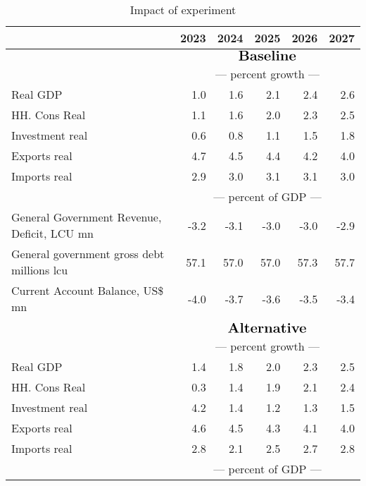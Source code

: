 \documentclass{article}
\begin{document}
\begin{table}[ht]
\caption{Impact of experiment}
\begin{tabular}{lrrrrr}
\toprule
 & 2023 & 2024 & 2025 & 2026 & 2027 \\
\midrule
&\multicolumn{5}{c}{{$\Large \textbf{Baseline}$}}                                                                                                     \\
&\multicolumn{5}{c}{{---  percent growth ---}}                                                                                                     \\
Real GDP & 1.0 & 1.6 & 2.1 & 2.4 & 2.6 \\
HH. Cons Real & 1.1 & 1.6 & 2.0 & 2.3 & 2.5 \\
Investment real & 0.6 & 0.8 & 1.1 & 1.5 & 1.8 \\
Exports real & 4.7 & 4.5 & 4.4 & 4.2 & 4.0 \\
Imports real & 2.9 & 3.0 & 3.1 & 3.1 & 3.0 \\
&\multicolumn{5}{c}{{---  percent of GDP ---}}                                                                                                     \\
General Government Revenue, Deficit, LCU mn & -3.2 & -3.1 & -3.0 & -3.0 & -2.9 \\
General government gross debt millions lcu & 57.1 & 57.0 & 57.0 & 57.3 & 57.7 \\
Current Account Balance, US\$ mn & -4.0 & -3.7 & -3.6 & -3.5 & -3.4 \\
&\multicolumn{5}{c}{{ }}                                                                                                     \\
&\multicolumn{5}{c}{{$\Large \textbf{Alternative}$}}                                                                                                     \\
&\multicolumn{5}{c}{{---  percent growth ---}}                                                                                                     \\
Real GDP & 1.4 & 1.8 & 2.0 & 2.3 & 2.5 \\
HH. Cons Real & 0.3 & 1.4 & 1.9 & 2.1 & 2.4 \\
Investment real & 4.2 & 1.4 & 1.2 & 1.3 & 1.5 \\
Exports real & 4.6 & 4.5 & 4.3 & 4.1 & 4.0 \\
Imports real & 2.8 & 2.1 & 2.5 & 2.7 & 2.8 \\
&\multicolumn{5}{c}{{---  percent of GDP ---}}                                                                                                     \\

\end{tabular}
\end{table}
\end{document}
